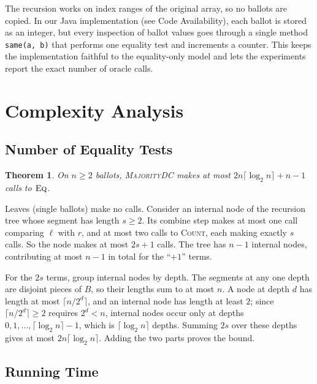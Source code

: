 \documentclass[conference]{IEEEtran}
\newtheorem{theorem}{Theorem}
\newcommand{\Eq}{\textsc{Eq}}
\begin{document}
The recursion works on index ranges of the original array, so no ballots are
copied. In our Java implementation (see Code Availability), each ballot is
stored as an integer, but every inspection of ballot values goes through a
single method \texttt{same(a, b)} that performs one equality test and
increments a counter. This keeps the implementation faithful to the
equality-only model and lets the experiments report the exact number of
oracle calls.

\section{Complexity Analysis}\label{sec:analysis}

\subsection{Number of Equality Tests}

\begin{theorem}\label{thm:bound}
On $n \ge 2$ ballots, \textsc{MajorityDC} makes at most
$2n\lceil\log_2 n\rceil + n - 1$ calls to $\Eq$.
\end{theorem}

\begin{IEEEproof}
Leaves (single ballots) make no calls. Consider an internal node of the
recursion tree whose segment has length $s \ge 2$. Its combine step makes at
most one call comparing $\ell$ with $r$, and at most two calls to
\textsc{Count}, each making exactly $s$ calls. So the node makes at most
$2s + 1$ calls. The tree has $n - 1$ internal nodes, contributing at most
$n - 1$ in total for the ``$+1$'' terms.

For the $2s$ terms, group internal nodes by depth. The segments at any one
depth are disjoint pieces of $B$, so their lengths sum to at most $n$. A node
at depth $d$ has length at most $\lceil n / 2^d \rceil$, and an internal node
has length at least $2$; since $\lceil n/2^d \rceil \ge 2$ requires
$2^d < n$, internal nodes occur only at depths
$0, 1, \ldots, \lceil\log_2 n\rceil - 1$, which is $\lceil \log_2 n\rceil$
depths. Summing $2s$ over these depths gives at most
$2n\lceil\log_2 n\rceil$. Adding the two parts proves the bound.
\end{IEEEproof}

\subsection{Running Time}
\end{document}
